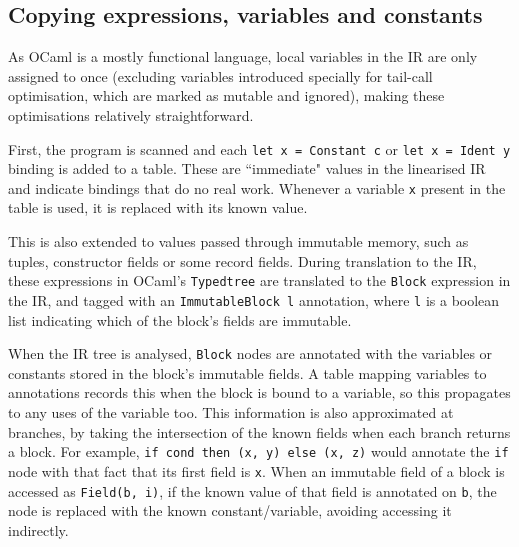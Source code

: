 

\subsection{Copying expressions, variables and constants}
As OCaml is a mostly functional language, local variables in the IR are only assigned to once (excluding variables introduced specially for tail-call optimisation, which are marked as mutable and ignored), making these optimisations relatively straightforward. 

First, the program is scanned and each \verb|let x = Constant c| or \verb|let x = Ident y| binding is added to a table. %
These are ``immediate" values in the linearised IR and indicate bindings that do no real work. Whenever a variable \verb|x| present in the table is used, it is replaced with its known value. 

This is also extended to values passed through immutable memory, such as tuples, constructor fields or some record fields. During translation to the IR, these expressions in OCaml's \verb|Typedtree| are translated to the \verb|Block| expression in the IR, and tagged with an \verb|ImmutableBlock l| annotation, where \verb|l| is a boolean list indicating which of the block's fields are immutable. 


When the IR tree is analysed, \verb|Block| nodes are annotated with the variables or constants stored in the block's immutable fields.
 A table mapping variables to annotations records this when the block is bound to a variable, so this propagates to any uses of the variable too. 
This information is also approximated at branches, by taking the intersection of the known fields when each branch returns a block. For example, \verb|if cond then (x, y) else (x, z)| would annotate the \verb|if| node with that fact that its first field is \verb|x|. 
When an immutable field of a block is accessed as \verb|Field(b, i)|, if the known value of that field is annotated on \verb|b|, the node is replaced with the known constant/variable, avoiding accessing it indirectly.

